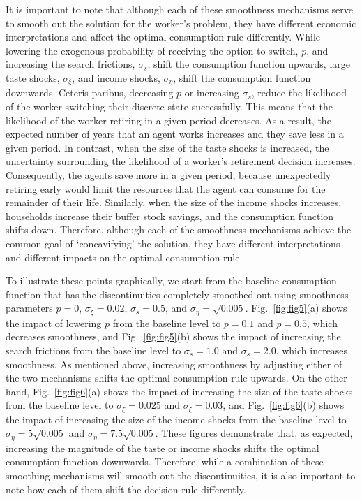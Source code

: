 \documentclass[11pt]{article}
\begin{document}
It is important to note that although each of these smoothness mechanisms serve
to smooth out the solution for the worker's problem, they have different economic
interpretations and affect the optimal consumption rule differently. While lowering
the exogenous probability of receiving the option to switch, $p$, and increasing the search
frictions, $\sigma_s$, shift the consumption function upwards, large taste shocks, $\sigma_\xi$, and income
shocks, $\sigma_\eta$, shift the consumption function downwards. Ceteris paribus, decreasing
$p$ or increasing $\sigma_s$, reduce the likelihood of the worker switching their discrete state
successfully. This means that the likelihood of the worker retiring in a given period
decreases. As a result, the expected number of years that an agent works increases
and they save less in a given period. In contrast, when the size of the taste shocks is
increased, the uncertainty surrounding the likelihood of a worker's retirement decision
increases. Consequently, the agents save more in a given period, because unexpectedly
retiring early would limit the resources that the agent can consume for the remainder of
their life. Similarly, when the size of the income shocks increases, households increase
their buffer stock savings, and the consumption function shifts down. Therefore,
although each of the smoothness mechanisms achieve the common goal of `concavifying'
the solution, they have different interpretations and different impacts on the optimal
consumption rule.

To illustrate these points graphically, we start from the baseline consumption function
that has the discontinuities completely smoothed out using smoothness parameters $p =
0$, $\sigma_\xi = 0.02$, $\sigma_s = 0.5$, and $\sigma_\eta = \sqrt{0.005}$. Fig.~\ref{fig:fig5}(a) shows the impact of lowering $p$ from the
baseline level to $p = 0.1$ and $p = 0.5$, which decreases smoothness, and Fig.~\ref{fig:fig5}(b) shows the
impact of increasing the search frictions from the baseline level to $\sigma_s = 1.0$ and $\sigma_s = 2.0$,
which increases smoothness. As mentioned above, increasing smoothness by adjusting
either of the two mechanisms shifts the optimal consumption rule upwards. On the
other hand, Fig.~\ref{fig:fig6}(a) shows the impact of increasing the size of the taste shocks from the
baseline level to $\sigma_\xi = 0.025$ and $\sigma_\xi = 0.03$, and Fig.~\ref{fig:fig6}(b) shows the impact of increasing the
size of the income shocks from the baseline level to $\sigma_\eta = 5\sqrt{0.005}$ and $\sigma_\eta = 7.5\sqrt{0.005}$.
These figures demonstrate that, as expected, increasing the magnitude of the taste or
income shocks shifts the optimal consumption function downwards. Therefore, while a
combination of these smoothing mechanisms will smooth out the discontinuities, it is
also important to note how each of them shift the decision rule differently.
\end{document}
